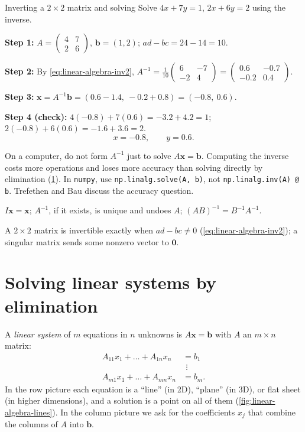 \begin{sample}{Inverting a $2\times2$ matrix and solving}
Solve $4x+7y=1$, $2x+6y=2$ using the inverse.

\textbf{Step 1:} $A=\begin{pmatrix}4&7\\2&6\end{pmatrix}$, $\bm b=(1,2)$; $ad-bc=24-14=10$.

\textbf{Step 2:} By \cref{eq:linear-algebra-inv2}, $A^{-1}=\frac1{10}\begin{pmatrix}6&-7\\-2&4\end{pmatrix}=\begin{pmatrix}0.6&-0.7\\-0.2&0.4\end{pmatrix}$.

\textbf{Step 3:} $\bm x=A^{-1}\bm b=(0.6-1.4,\ -0.2+0.8)=(-0.8,\ 0.6)$.

\textbf{Step 4 (check):} $4(-0.8)+7(0.6)=-3.2+4.2=1$; $2(-0.8)+6(0.6)=-1.6+3.6=2$.
\[
\boxed{x=-0.8,\qquad y=0.6.}
\]
\end{sample}

\begin{pitfall}
On a computer, do not form $A^{-1}$ just to solve $A\bm x=\bm b$. Computing the inverse costs more operations and loses more accuracy than solving directly by elimination (\cref{sec:linear-algebra-elim}). In \texttt{numpy}, use \texttt{np.linalg.solve(A, b)}, not \texttt{np.linalg.inv(A) @ b}. Trefethen and Bau \cite{trefethen} discuss the accuracy question.
\end{pitfall}

\begin{keyideas}
\item $I\bm x=\bm x$; $A^{-1}$, if it exists, is unique and undoes $A$; $(AB)^{-1}=B^{-1}A^{-1}$.
\item A $2\times2$ matrix is invertible exactly when $ad-bc\ne0$ (\cref{eq:linear-algebra-inv2}); a singular matrix sends some nonzero vector to $\bm 0$.
\end{keyideas}

\section{Solving linear systems by elimination}\label{sec:linear-algebra-elim}

A \emph{linear system} of $m$ equations in $n$ unknowns is $A\bm x=\bm b$ with $A$ an $m\times n$ matrix:
\[
\begin{aligned}
A_{11}x_1+\dots+A_{1n}x_n&=b_1\\
&\ \,\vdots\\
A_{m1}x_1+\dots+A_{mn}x_n&=b_m .
\end{aligned}
\]
In the row picture each equation is a ``line'' (in 2D), ``plane'' (in 3D), or flat sheet (in higher dimensions), and a solution is a point on all of them (\cref{fig:linear-algebra-lines}). In the column picture we ask for the coefficients $x_j$ that combine the columns of $A$ into $\bm b$.

